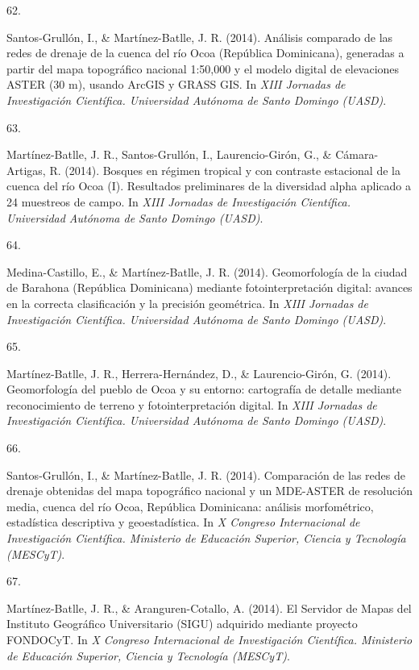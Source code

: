 \documentclass[10pt,a4paper,]{article}
\newlength{\cslhangindent}
\newlength{\csllabelwidth}
\newcommand{\CSLLeftMargin}[1]{\parbox[t]{\csllabelwidth}{\hfill #1~}}
\newcommand{\CSLRightInline}[1]{\parbox[t]{\linewidth - \cslhangindent - \csllabelwidth}{#1}\vspace{0.8ex}}
\begin{document}
\leavevmode\hypertarget{ref-Jose_Ramon_Martinez-Batlle_108100916}{}%
\CSLLeftMargin{62. }
\CSLRightInline{Santos-Grullón, I., \& Martínez-Batlle, J. R. (2014).
Análisis comparado de las redes de drenaje de la cuenca del río Ocoa
(República Dominicana), generadas a partir del mapa topográfico nacional
1:50,000 y el modelo digital de elevaciones ASTER (30 m), usando ArcGIS
y GRASS GIS. In \emph{XIII Jornadas de Investigación Científica.
Universidad Autónoma de Santo Domingo (UASD)}.}

\leavevmode\hypertarget{ref-Jose_Ramon_Martinez-Batlle_108100865}{}%
\CSLLeftMargin{63. }
\CSLRightInline{Martínez-Batlle, J. R., Santos-Grullón, I.,
Laurencio-Girón, G., \& Cámara-Artigas, R. (2014). Bosques en régimen
tropical y con contraste estacional de la cuenca del río Ocoa (I).
Resultados preliminares de la diversidad alpha aplicado a 24 muestreos
de campo. In \emph{XIII Jornadas de Investigación Científica.
Universidad Autónoma de Santo Domingo (UASD)}.}

\leavevmode\hypertarget{ref-Jose_Ramon_Martinez-Batlle_108101000}{}%
\CSLLeftMargin{64. }
\CSLRightInline{Medina-Castillo, E., \& Martínez-Batlle, J. R. (2014).
Geomorfología de la ciudad de Barahona (República Dominicana) mediante
fotointerpretación digital: avances en la correcta clasificación y la
precisión geométrica. In \emph{XIII Jornadas de Investigación
Científica. Universidad Autónoma de Santo Domingo (UASD)}.}

\leavevmode\hypertarget{ref-Jose_Ramon_Martinez-Batlle_108100990}{}%
\CSLLeftMargin{65. }
\CSLRightInline{Martínez-Batlle, J. R., Herrera-Hernández, D., \&
Laurencio-Girón, G. (2014). Geomorfología del pueblo de Ocoa y su
entorno: cartografía de detalle mediante reconocimiento de terreno y
fotointerpretación digital. In \emph{XIII Jornadas de Investigación
Científica. Universidad Autónoma de Santo Domingo (UASD)}.}

\leavevmode\hypertarget{ref-Jose_Ramon_Martinez-Batlle_108101655}{}%
\CSLLeftMargin{66. }
\CSLRightInline{Santos-Grullón, I., \& Martínez-Batlle, J. R. (2014).
Comparación de las redes de drenaje obtenidas del mapa topográfico
nacional y un MDE-ASTER de resolución media, cuenca del río Ocoa,
República Dominicana: análisis morfométrico, estadística descriptiva y
geoestadística. In \emph{X Congreso Internacional de Investigación
Científica. Ministerio de Educación Superior, Ciencia y Tecnología
(MESCyT)}.}

\leavevmode\hypertarget{ref-Jose_Ramon_Martinez-Batlle_108101322}{}%
\CSLLeftMargin{67. }
\CSLRightInline{Martínez-Batlle, J. R., \& Aranguren-Cotallo, A. (2014).
El Servidor de Mapas del Instituto Geográfico Universitario (SIGU)
adquirido mediante proyecto FONDOCyT. In \emph{X Congreso Internacional
de Investigación Científica. Ministerio de Educación Superior, Ciencia y
Tecnología (MESCyT)}.}
\end{document}

